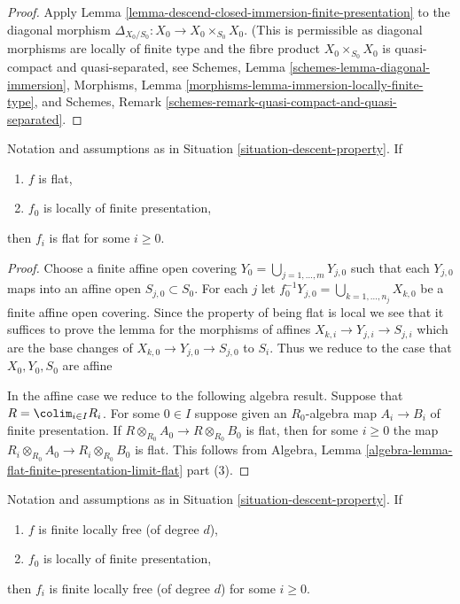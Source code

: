 \begin{proof}
Apply Lemma \ref{lemma-descend-closed-immersion-finite-presentation}
to the diagonal morphism $\Delta_{X_0/S_0} : X_0 \to X_0 \times_{S_0} X_0$.
(This is permissible as diagonal morphisms are locally of finite type
and the fibre product $X_0 \times_{S_0} X_0$ is quasi-compact and
quasi-separated, see
Schemes, Lemma \ref{schemes-lemma-diagonal-immersion},
Morphisms, Lemma \ref{morphisms-lemma-immersion-locally-finite-type}, and
Schemes, Remark \ref{schemes-remark-quasi-compact-and-quasi-separated}.
\end{proof}

\begin{lemma}
\label{lemma-descend-flat-finite-presentation}
Notation and assumptions as in Situation \ref{situation-descent-property}.
If
\begin{enumerate}
\item $f$ is flat,
\item $f_0$ is locally of finite presentation,
\end{enumerate}
then $f_i$ is flat for some $i \geq 0$.
\end{lemma}

\begin{proof}
Choose a finite affine open covering
$Y_0 = \bigcup_{j = 1, \ldots, m} Y_{j, 0}$
such that each $Y_{j, 0}$ maps into an affine open
$S_{j, 0} \subset S_0$. For each $j$ let
$f_0^{-1}Y_{j, 0} = \bigcup_{k = 1, \ldots, n_j} X_{k, 0}$ be a
finite affine open covering. Since the property of being flat is
local we see that it suffices to prove the lemma for the morphisms
of affines $X_{k, i} \to Y_{j, i} \to S_{j, i}$ which are the base
changes of $X_{k, 0} \to Y_{j, 0} \to S_{j, 0}$ to $S_i$.
Thus we reduce to the case that $X_0, Y_0, S_0$ are affine

\medskip\noindent
In the affine case we reduce to the following algebra result.
Suppose that $R = \colim_{i \in I} R_i$. For some $0 \in I$
suppose given an $R_0$-algebra map $A_i \to B_i$ of finite presentation.
If $R \otimes_{R_0} A_0 \to R \otimes_{R_0} B_0$ is flat, then
for some $i \geq 0$ the map
$R_i \otimes_{R_0} A_0 \to R_i \otimes_{R_0} B_0$ is flat.
This follows from Algebra,
Lemma \ref{algebra-lemma-flat-finite-presentation-limit-flat} part (3).
\end{proof}

\begin{lemma}
\label{lemma-descend-finite-locally-free}
Notation and assumptions as in Situation \ref{situation-descent-property}.
If
\begin{enumerate}
\item $f$ is finite locally free (of degree $d$),
\item $f_0$ is locally of finite presentation,
\end{enumerate}
then $f_i$ is finite locally free (of degree $d$) for some $i \geq 0$.
\end{lemma}

